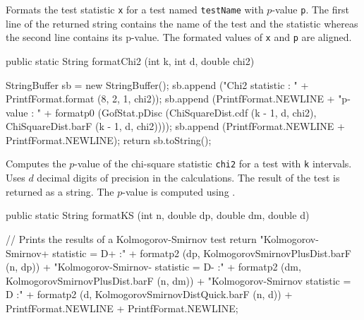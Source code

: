 \begin{tabb}   Formats the test statistic \texttt{x} for a test named \texttt{testName}
   with $p$-value \texttt{p}.  The first line of the returned string contains
   the name of the test and the statistic whereas the second line contains
   its p-value.  The formated values of \texttt{x} and \texttt{p} are
   aligned.
\end{tabb}
\begin{htmlonly}
\end{htmlonly}
\begin{code}

   public static String formatChi2 (int k, int d, double chi2)\begin{hide} {
      StringBuffer sb = new StringBuffer();
      sb.append ("Chi2 statistic                        : " +
                  PrintfFormat.format (8, 2, 1, chi2));
      sb.append (PrintfFormat.NEWLINE +
                 "p-value                               : " +
                 formatp0 (GofStat.pDisc
                          (ChiSquareDist.cdf (k - 1, d, chi2),
                           ChiSquareDist.barF (k - 1, d, chi2))));
      sb.append (PrintfFormat.NEWLINE + PrintfFormat.NEWLINE);
      return sb.toString();
   }\end{hide}
\end{code}
\begin{tabb}   Computes the $p$-value of the chi-square statistic
  \texttt{chi2} for a test with \texttt{k} intervals.  Uses $d$ decimal digits
  of precision in the calculations. The result of the
  test is returned as a string.  The $p$-value is computed using
  .
\end{tabb}
\begin{htmlonly}
\end{htmlonly}
\begin{code}

   public static String formatKS (int n, double dp,
                                  double dm, double d)\begin{hide} {
      // Prints the results of a Kolmogorov-Smirnov test
      return "Kolmogorov-Smirnov+ statistic = D+    :" +
             formatp2 (dp, KolmogorovSmirnovPlusDist.barF (n, dp)) +
             "Kolmogorov-Smirnov- statistic = D-    :" +
             formatp2 (dm, KolmogorovSmirnovPlusDist.barF (n, dm)) +
             "Kolmogorov-Smirnov statistic = D      :" +
             formatp2 (d, KolmogorovSmirnovDistQuick.barF (n, d)) +
                       PrintfFormat.NEWLINE + PrintfFormat.NEWLINE;
   }\end{hide}
\end{code}
